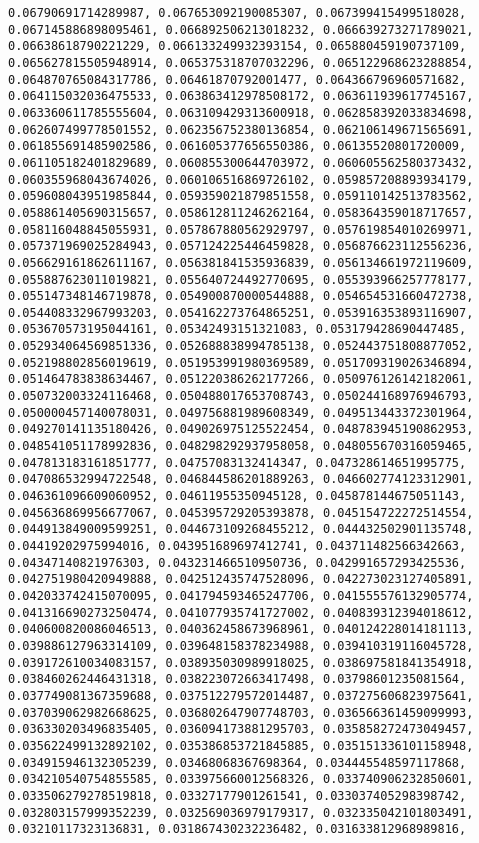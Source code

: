 \documentclass[11pt]{article}
\begin{document}
\begin{Verbatim}[commandchars=\\\{\}]
0.06790691714289987, 0.067653092190085307, 0.067399415499518028, 0.067145886898095461, 0.066892506213018232, 0.066639273271789021, 0.06638618790221229, 0.066133249932393154, 0.065880459190737109, 0.065627815505948914, 0.065375318707032296, 0.065122968623288854, 0.064870765084317786, 0.06461870792001477, 0.064366796960571682, 0.064115032036475533, 0.063863412978508172, 0.063611939617745167, 0.063360611785555604, 0.063109429313600918, 0.062858392033834698, 0.062607499778501552, 0.062356752380136854, 0.062106149671565691, 0.061855691485902586, 0.061605377656550386, 0.06135520801720009, 0.061105182401829689, 0.060855300644703972, 0.060605562580373432, 0.060355968043674026, 0.060106516869726102, 0.059857208893934179, 0.059608043951985844, 0.059359021879851558, 0.059110142513783562, 0.058861405690315657, 0.058612811246262164, 0.058364359018717657, 0.058116048845055931, 0.057867880562929797, 0.057619854010269971, 0.057371969025284943, 0.057124225446459828, 0.056876623112556236, 0.056629161862611167, 0.056381841535936839, 0.056134661972119609, 0.055887623011019821, 0.055640724492770695, 0.055393966257778177, 0.055147348146719878, 0.054900870000544888, 0.054654531660472738, 0.054408332967993203, 0.054162273764865251, 0.053916353893116907, 0.053670573195044161, 0.05342493151321083, 0.053179428690447485, 0.052934064569851336, 0.052688838994785138, 0.052443751808877052, 0.052198802856019619, 0.051953991980369589, 0.051709319026346894, 0.051464783838634467, 0.051220386262177266, 0.050976126142182061, 0.050732003324116468, 0.050488017653708743, 0.050244168976946793, 0.050000457140078031, 0.049756881989608349, 0.049513443372301964, 0.049270141135180426, 0.049026975125522454, 0.048783945190862953, 0.048541051178992836, 0.048298292937958058, 0.048055670316059465, 0.047813183161851777, 0.04757083132414347, 0.047328614651995775, 0.047086532994722548, 0.046844586201889263, 0.046602774123312901, 0.046361096609060952, 0.04611955350945128, 0.045878144675051143, 0.045636869956677067, 0.045395729205393878, 0.045154722272514554, 0.044913849009599251, 0.044673109268455212, 0.044432502901135748, 0.04419202975994016, 0.043951689697412741, 0.043711482566342663, 0.04347140821976303, 0.043231466510950736, 0.042991657293425536, 0.042751980420949888, 0.042512435747528096, 0.042273023127405891, 0.042033742415070095, 0.041794593465247706, 0.041555576132905774, 0.041316690273250474, 0.041077935741727002, 0.040839312394018612, 0.040600820086046513, 0.040362458673968961, 0.040124228014181113, 0.039886127963314109, 0.039648158378234988, 0.039410319116045728, 0.039172610034083157, 0.038935030989918025, 0.038697581841354918, 0.038460262446431318, 0.038223072663417498, 0.03798601235081564, 0.037749081367359688, 0.037512279572014487, 0.037275606823975641, 0.037039062982668625, 0.036802647907748703, 0.036566361459099993, 0.036330203496835405, 0.036094173881295703, 0.035858272473049457, 0.035622499132892102, 0.035386853721845885, 0.035151336101158948, 0.034915946132305239, 0.03468068367698364, 0.034445548597117868, 0.034210540754855585, 0.033975660012568326, 0.033740906232850601, 0.033506279278519818, 0.03327177901261541, 0.033037405298398742, 0.032803157999352239, 0.032569036979179317, 0.032335042101803491, 0.03210117323136831, 0.031867430232236482, 0.031633812968989816, 
\end{Verbatim}
\end{document}
